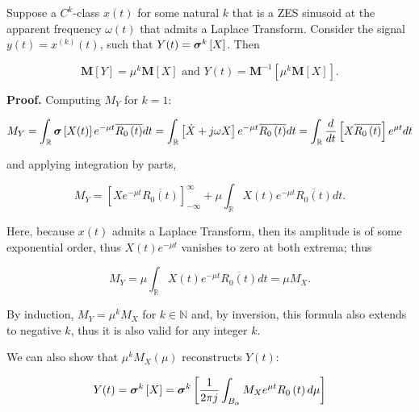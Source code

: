 \begin{theorem}\label{theo:mu_transf_and_dpfs} %
	Suppose a $C^k$-class $x(t)$ for some natural $k$ that is a ZES sinusoid at the apparent frequency $\omega(t)$ that admits a Laplace Transform. Consider the signal $y(t) = x^{(k)}(t)$, such that $Y(t) = \boldsymbol{\sigma}^{k}\left[X\right]$. Then

\begin{equation} \mathbf{M}\left[Y\right] = \mu^k \mathbf{M}\left[X\right] \text{ and } Y(t) = \mathbf{M}^{-1}\left[\mu^k \mathbf{M}\left[X\right]\right] .\end{equation}
\end{theorem}
\textbf{Proof.} Computing $M_Y$ for $k=1$:

\begin{equation} M_Y = \int_{\mathbb{R}} \boldsymbol{\sigma} \left[X(t)\right]  e^{-\mu  t} \overline{R_0\left(t\right)} dt = \int_{\mathbb{R}} \left[\dot{X} + j\omega X\right]  e^{-\mu  t} \overline{R_0\left(t\right)} dt = \int_{\mathbb{R}} \dfrac{d}{dt}\left[X \overline{R_0\left(t\right)}\right] e^{\mu t} dt \end{equation}

	\noindent and applying integration by parts,

\begin{equation}  M_Y = \left[X e^{-\mu t} \overline{R_0\left(t\right)}\right]_{-\infty}^{\infty} + \mu \int_{\mathbb{R}} X(t) e^{-\mu  t} \overline{R_0\left(t\right)} dt .\end{equation}

	Here, because $x(t)$ admits a Laplace Transform, then its amplitude is of some exponential order, thus $X(t)e^{-\mu t}$ vanishes to zero at both extrema; thus

\begin{equation}  M_Y = \mu \int_{\mathbb{R}} X(t) e^{-\mu  t} \overline{R_0\left(t\right)} dt = \mu M_X.\end{equation}

	By induction, $M_Y = \mu^k M_X$ for $k\in \mathbb{N}$ and, by inversion, this formula also extends to negative $k$, thus it is also valid for any integer $k$.

	We can also show that $\mu^k M_X(\mu)$ reconstructs $Y(t)$:

\begin{equation} Y(t) = \boldsymbol{\sigma}^{k}\left[X\right] = \boldsymbol{\sigma}^{k} \left[\dfrac{1}{2\pi j}  \int_{B_\alpha} M_X  e^{\mu  t} R_0\left(t\right) d\mu \right]  \end{equation}

